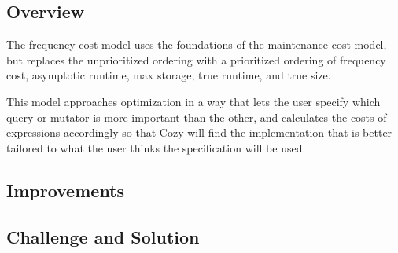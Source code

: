\newcommand{\code}[1]{\texttt{#1}}

\subsection{Overview}
The frequency cost model uses the foundations of the maintenance cost model, but
replaces the unprioritized ordering with a prioritized ordering of frequency
cost, asymptotic runtime, max storage, true runtime, and true size. 

This model approaches optimization in a way that lets the user specify which
query or mutator is more important than the other, and calculates the costs of
expressions accordingly so that Cozy will find the implementation that is better
tailored to what the user thinks the specification will be used.

\subsection{Improvements}

\subsection{Challenge and Solution}
